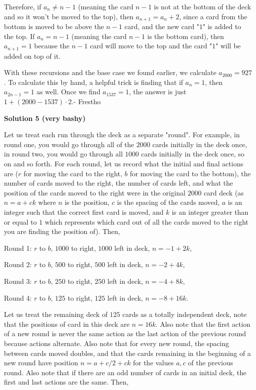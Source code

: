 \begin{enumerate}
 Therefore, if $a_n \ne n-1$ (meaning the card $n-1$ is not at the bottom of the deck and so it won't be moved to the top), then $a_{n+1} = a_n + 2$, since a card from the bottom is moved to be above the $n-1$ card, and the new card "$1$" is added to the top. If $a_n = n-1$ (meaning the card $n-1$ is the bottom card), then $a_{n+1}=1$ because the $n-1$ card will move to the top and the card "$1$" will be added on top of it.

 With these recursions and the base case we found earlier, we calculate $a_{2000} = \boxed{927}$. To calculate this by hand, a helpful trick is finding that if $a_n=1$, then $a_{2n-1}=1$ as well. Once we find $a_{1537}=1$, the answer is just $1+(2000-1537)\cdot2$.- Frestho

 



\textbf{Solution 5 (very bashy)}

Let us treat each run through the deck as a separate "round". For example, in round one, you would go through all of the $2000$ cards initially in the deck once, in round two, you would go through all $1000$ cards initially in the deck once, so on and so forth. For each round, let us record what the initial and final actions are ($r$ for moving the card to the right, $b$ for moving the card to the bottom), the number of cards moved to the right, the number of cards left, and what the position of the cards moved to the right were in the original $2000$ card deck (as $n = a + ck$ where $n$ is the position, $c$ is the spacing of the cards moved, $a$ is an integer such that the correct first card is moved, and $k$ is an integer greater than or equal to $1$ which represents which card out of all the cards moved to the right you are finding the position of). Then,

 Round 1: $r$ to $b$, $1000$ to right, $1000$ left in deck, $n = -1 + 2k$,

 Round 2: $r$ to $b$, $500$ to right, $500$ left in deck, $n = -2 + 4k$,

 Round 3: $r$ to $b$, $250$ to right, $250$ left in deck, $n = -4 + 8k$,

 Round 4: $r$ to $b$, $125$ to right, $125$ left in deck, $n = -8 + 16k$.

 Let us treat the remaining deck of $125$ cards as a totally independent deck, note that the positions of card in this deck are $n = 16k$. Also note that the first action of a new round is never the same action as the last action of the previous round because actions alternate. Also note that for every new round, the spacing between cards moved doubles, and that the cards remaining in the beginning of a new round have position $n = a + c/2 + ck$ for the values $a, c$ of the previous round. Also note that if there are an odd number of cards in an initial deck, the first and last actions are the same. Then,


\end{enumerate}
